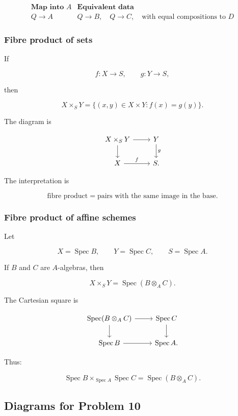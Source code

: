 \documentclass[12pt,a4paper]{article}
\theoremstyle{notespace}
\begin{document}
\[
\begin{array}{c|c}
	\textbf{Map into }A & \textbf{Equivalent data} \\
	\hline
	Q\to A
	&
	Q\to B,\quad Q\to C,\quad \text{with equal compositions to }D
\end{array}
\]

\subsubsection{Fibre product of sets}

If

\[
f:X\to S,
\qquad
g:Y\to S,
\]

then

\[
X\times_S Y
=
\{(x,y)\in X\times Y:f(x)=g(y)\}.
\]

The diagram is

\[
\begin{tikzcd}
	X\times_S Y \arrow[r] \arrow[d]
	&
	Y \arrow[d,"g"]
	\\
	X \arrow[r,"f"]
	&
	S.
\end{tikzcd}
\]

The interpretation is

\[
\boxed{
	\text{fibre product}=\text{pairs with the same image in the base}.
}
\]

\subsubsection{Fibre product of affine schemes}

Let

\[
X=\operatorname{Spec}B,
\qquad
Y=\operatorname{Spec}C,
\qquad
S=\operatorname{Spec}A.
\]

If \(B\) and \(C\) are \(A\)-algebras, then

\[
X\times_S Y
=
\operatorname{Spec}(B\otimes_A C).
\]

The Cartesian square is

\[
\begin{tikzcd}
	\operatorname{Spec}(B\otimes_A C) \arrow[r] \arrow[d]
	&
	\operatorname{Spec}C \arrow[d]
	\\
	\operatorname{Spec}B \arrow[r]
	&
	\operatorname{Spec}A.
\end{tikzcd}
\]

Thus:

\[
\boxed{
	\operatorname{Spec}B\times_{\operatorname{Spec}A}\operatorname{Spec}C
	=
	\operatorname{Spec}(B\otimes_A C).
}
\]

\subsection{Diagrams for Problem 10}
\end{document}
